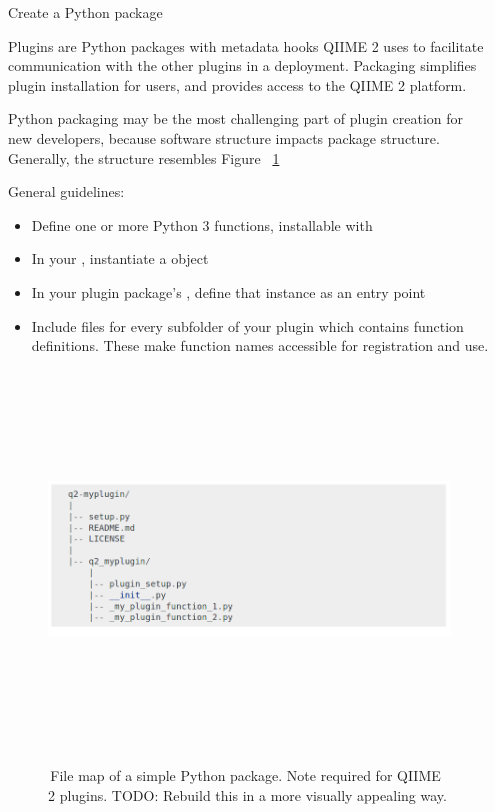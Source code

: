 \documentclass[final]{beamer}
\newlength{\sepwidth}
\newlength{\colwidth}
\newcommand{\separatorcolumn}{\begin{column}{\sepwidth}\end{column}}
\begin{document}
\begin{frame}[t]
\begin{columns}[t]
\separatorcolumn

\begin{column}{\colwidth}

  \begin{block}{Create a Python package}

    Plugins are Python packages with metadata hooks QIIME 2 uses to facilitate
    communication with the other plugins in a deployment. Packaging
    simplifies plugin installation for users, and provides access to the QIIME 2 platform.

    \begin{tcolorbox}
    [width=\textwidth, colframe=blue]
    {Python packaging may be the most challenging part of plugin creation
    for new developers, because software structure impacts package structure.
    Generally, the structure resembles Figure ~\ref{fig:packageStructure}}
    \end{tcolorbox}

    General guidelines:
    \begin{itemize}
      \item Define one or more Python 3 functions, installable with 
      \item In your , instantiate a  object
      \item In your plugin package's , define that instance as an entry point
      \item Include  files for every subfolder of your plugin which
      contains function definitions. These make function names accessible for registration and use.
    \end{itemize}
  \end{block}

  \begin{figure}[tph!]
    {\includegraphics[height=10cm]{assets/package_structure}}
    \caption{\,File map of a simple Python package. Note  required for QIIME 2 plugins.
    TODO: Rebuild this in a more visually appealing way.}
    \label{fig:packageStructure}
  \end{figure}


\end{column}
\end{columns}
\end{frame}
\end{document}
